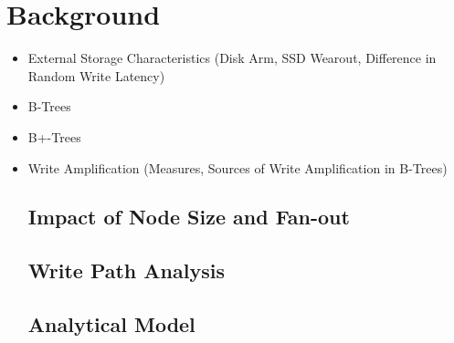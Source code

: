 \chapter{Background}
\begin{itemize}
    \item External Storage Characteristics (Disk Arm, SSD Wearout, Difference in Random Write Latency)
    \item B-Trees
    \item B+-Trees
    \item Write Amplification (Measures, Sources of Write Amplification in B-Trees)
    \section{Impact of Node Size and Fan-out}
    \section{Write Path Analysis}
    \section{Analytical Model}
\end{itemize}
